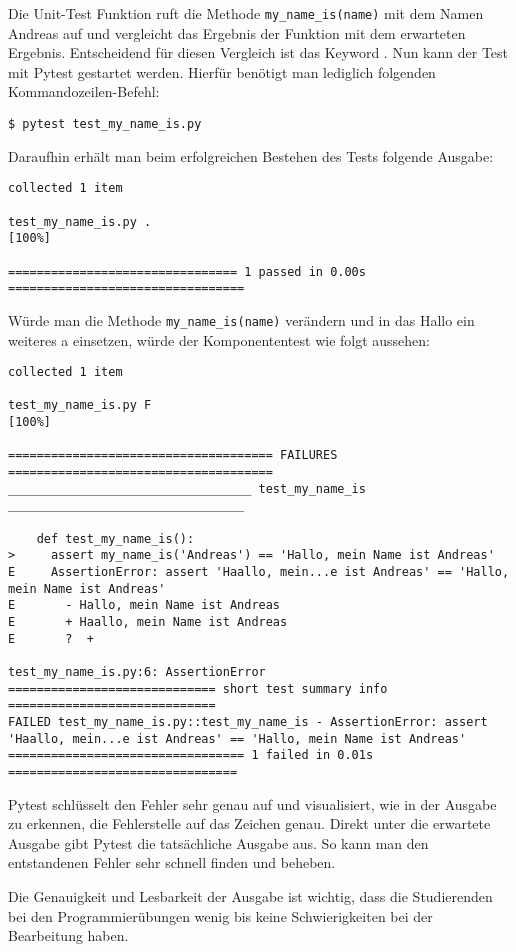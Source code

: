 Die Unit-Test Funktion  ruft die Methode
\texttt{my\_name\_is(name)} mit dem Namen \glqq Andreas\grqq{} auf und
vergleicht das Ergebnis der Funktion mit dem erwarteten Ergebnis. Entscheidend
für diesen Vergleich ist das Keyword . Nun kann der Test mit
Pytest gestartet werden. Hierfür benötigt man lediglich folgenden
Kommandozeilen-Befehl:

\begin{lstlisting}[style=Bash]
    $ pytest test_my_name_is.py
\end{lstlisting}

Daraufhin erhält man beim erfolgreichen Bestehen des Tests folgende Ausgabe:

\begin{lstlisting}[style=Bash]
collected 1 item                                                               

test_my_name_is.py .                                                                  [100%]

================================ 1 passed in 0.00s =================================
\end{lstlisting}

Würde man die Methode \texttt{my\_name\_is(name)} verändern und in das
\glqq Hallo\grqq{} ein weiteres \glqq a\grqq{} einsetzen, würde der
Komponententest wie folgt aussehen:

\begin{lstlisting}[style=Bash]
collected 1 item                                                                                                                      

test_my_name_is.py F                                                                  [100%]

===================================== FAILURES =====================================
__________________________________ test_my_name_is _________________________________

    def test_my_name_is():
>     assert my_name_is('Andreas') == 'Hallo, mein Name ist Andreas'
E     AssertionError: assert 'Haallo, mein...e ist Andreas' == 'Hallo, mein Name ist Andreas'
E       - Hallo, mein Name ist Andreas
E       + Haallo, mein Name ist Andreas
E       ?  +

test_my_name_is.py:6: AssertionError
============================= short test summary info =============================
FAILED test_my_name_is.py::test_my_name_is - AssertionError: assert 'Haallo, mein...e ist Andreas' == 'Hallo, mein Name ist Andreas'
================================= 1 failed in 0.01s ================================
\end{lstlisting}

Pytest schlüsselt den Fehler sehr genau auf und visualisiert, wie in der Ausgabe
zu erkennen, die Fehlerstelle auf das Zeichen genau. Direkt unter die erwartete
Ausgabe gibt Pytest die tatsächliche Ausgabe aus. So kann man den entstandenen
Fehler sehr schnell finden und beheben.

Die Genauigkeit und Lesbarkeit der Ausgabe ist wichtig, dass die Studierenden
bei den Programmierübungen wenig bis keine Schwierigkeiten bei der Bearbeitung
haben.